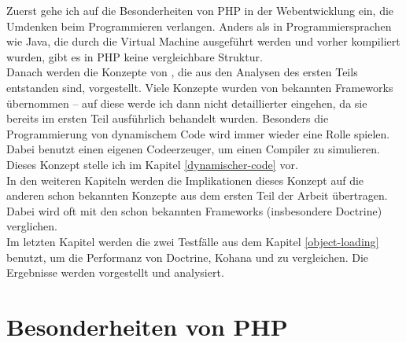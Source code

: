 Zuerst gehe ich auf die Besonderheiten von PHP in der Webentwicklung ein, die Umdenken beim Programmieren verlangen. Anders als in Programmiersprachen wie Java, die durch die Virtual Machine ausgeführt werden und vorher kompiliert wurden, gibt es in PHP keine vergleichbare Struktur. \\
Danach werden die Konzepte von \PSCORM, die aus den Analysen des ersten Teils entstanden sind, vorgestellt. Viele Konzepte wurden von bekannten Frameworks übernommen -- auf diese werde ich dann nicht detaillierter eingehen, da sie bereits im ersten Teil ausführlich behandelt wurden. Besonders die Programmierung von dynamischem Code wird immer wieder eine Rolle spielen. Dabei benutzt \PSCORM einen eigenen Codeerzeuger, um einen Compiler zu simulieren. Dieses Konzept stelle ich im Kapitel \ref{dynamischer-code} vor. \\
In den weiteren Kapiteln werden die Implikationen dieses Konzept auf die anderen schon bekannten Konzepte aus dem ersten Teil der Arbeit übertragen. Dabei wird oft mit den schon bekannten Frameworks (insbesondere Doctrine) verglichen. \\
Im letzten Kapitel werden die zwei Testfälle aus dem Kapitel \ref{object-loading} benutzt, um die Performanz von Doctrine, Kohana und \PSCORM zu vergleichen. Die Ergebnisse werden vorgestellt und analysiert. \\

\section{Besonderheiten von PHP} \label{besonderheiten-php}

